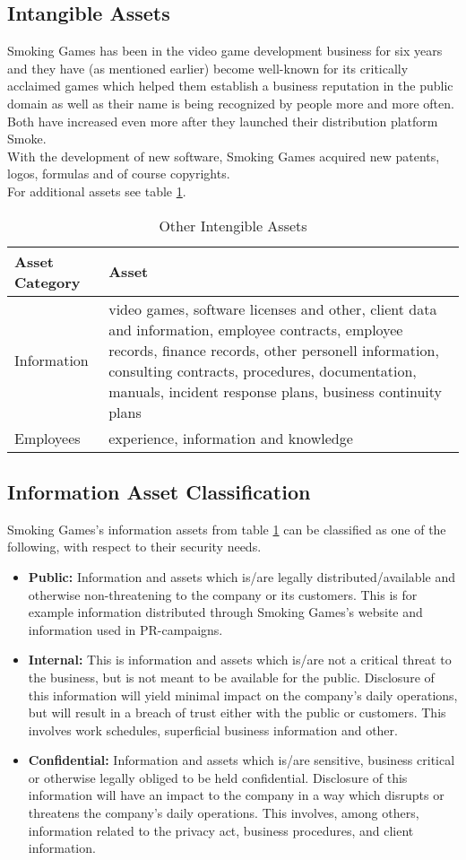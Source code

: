 \subsection{Intangible Assets}
Smoking Games has been in the video game development business for six years and they have (as mentioned earlier) become well-known for its critically acclaimed games which helped them establish a business reputation in the public domain as well as their name is being recognized by people more and more often. Both have increased even more after they launched their distribution platform Smoke.\\
With the development of new software, Smoking Games acquired new patents, logos, formulas and of course copyrights.\\
For additional assets see table \ref{tab:OtherTangibleAssets}. 
\begin{table}[h]
	\centering
	\begin{tabular}{l | l}
		\textbf{Asset Category} & \textbf{Asset}\\\hline\hline
		Information & \parbox[t]{7cm}{video games, software licenses and other, client data and information, employee contracts, employee records, finance records, other personell information, consulting contracts, procedures, documentation, manuals, incident response plans, business continuity plans}\\\hline
		Employees & \parbox[t]{7cm}{experience, information and knowledge}
	\end{tabular}
	\caption{Other Intengible Assets}\label{tab:OtherTangibleAssets}
\end{table}
\newpage
\subsection{Information Asset Classification}
Smoking Games's information assets from table \ref{tab:OtherTangibleAssets} can be classified as one of the following, with respect to their security needs.\\
\medskip
\begin{itemize}
	\item \textbf{Public:} Information and assets which is/are legally distributed/available and otherwise non-threatening to the company or its customers. This is for example information distributed through Smoking Games's website and information used in PR-campaigns.
	\item \textbf{Internal:} This is information and assets which is/are not a critical threat to the business, but is not meant to be available for the public. Disclosure of this information will yield minimal impact on the company’s daily operations, but will result in a breach of trust either with the public or customers. This involves work schedules, superficial business information and other.
	\item \textbf{Confidential:} Information and assets which is/are sensitive, business critical or otherwise legally obliged to be held confidential. Disclosure of this information will have an impact to the company in a way which disrupts or threatens the company’s daily operations. This involves, among others, information related to the privacy act, business procedures, and client information.
\end{itemize}
\newpage